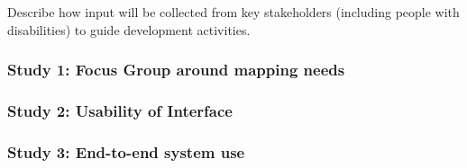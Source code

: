 Describe how input will be collected from key stakeholders (including people with disabilities) to guide development activities.

\subsubsection{Study 1: Focus Group around mapping needs}

\subsubsection{Study 2: Usability of Interface}

\subsubsection{Study 3: End-to-end system use}
\label{sec:field-web}
